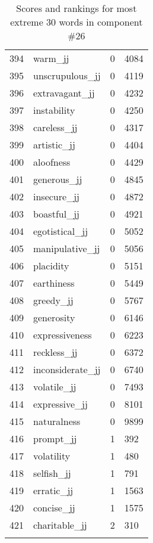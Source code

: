 \begin{longtable}[!htbp]{| rlr@{.}l |}
    394 & warm\_jj & 0 & 4084 \\
    395 & unscrupulous\_jj & 0 & 4119 \\
    396 & extravagant\_jj & 0 & 4232 \\
    397 & instability & 0 & 4250 \\
    398 & careless\_jj & 0 & 4317 \\
    399 & artistic\_jj & 0 & 4404 \\
    400 & aloofness & 0 & 4429 \\
    401 & generous\_jj & 0 & 4845 \\
    402 & insecure\_jj & 0 & 4872 \\
    403 & boastful\_jj & 0 & 4921 \\
    404 & egotistical\_jj & 0 & 5052 \\
    405 & manipulative\_jj & 0 & 5056 \\
    406 & placidity & 0 & 5151 \\
    407 & earthiness & 0 & 5449 \\
    408 & greedy\_jj & 0 & 5767 \\
    409 & generosity & 0 & 6146 \\
    410 & expressiveness & 0 & 6223 \\
    411 & reckless\_jj & 0 & 6372 \\
    412 & inconsiderate\_jj & 0 & 6740 \\
    413 & volatile\_jj & 0 & 7493 \\
    414 & expressive\_jj & 0 & 8101 \\
    415 & naturalness & 0 & 9899 \\
    416 & prompt\_jj & 1 & 392 \\
    417 & volatility & 1 & 480 \\
    418 & selfish\_jj & 1 & 791 \\
    419 & erratic\_jj & 1 & 1563 \\
    420 & concise\_jj & 1 & 1575 \\
    421 & charitable\_jj & 2 & 310 \\
    \hline
    \caption{Scores and rankings for most extreme 30 words in component \#26} \\
\end{longtable}
